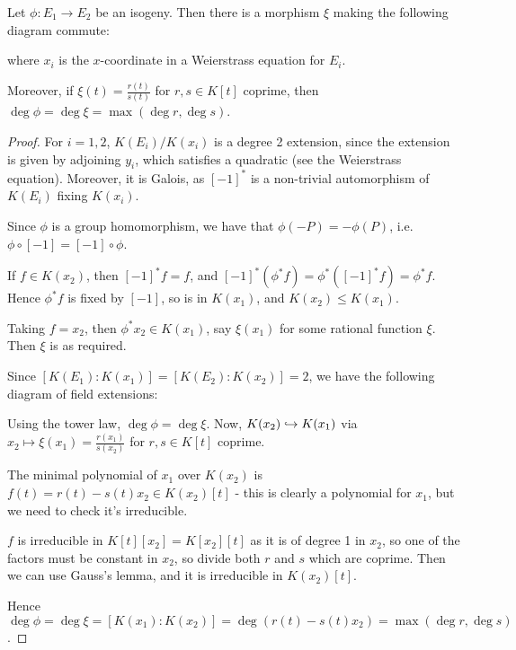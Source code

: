 \documentclass[10pt,a4paper]{article}
\begin{document}
\begin{lemma}
  Let $\phi:E_1\to E_2$ be an isogeny. Then there is a morphism $\xi$ making the following diagram commute:

  \begin{center}
  \end{center}

  where $x_i$ is the $x$-coordinate in a Weierstrass equation for $E_i$.

  Moreover, if $\xi(t) = \frac{r(t)}{s(t)}$ for $r, s \in K[t]$ coprime, then $\deg \phi = \deg \xi = \max(\deg r, \deg s)$.
\end{lemma}
\begin{proof}
  For $i = 1,2$, $K(E_i)/K(x_i)$ is a degree 2 extension, since the extension is given by adjoining $y_i$, which satisfies a quadratic (see the Weierstrass equation). Moreover, it is Galois, as $[-1]^\ast$ is a non-trivial automorphism of $K(E_i)$ fixing $K(x_i)$.

  Since $\phi$ is a group homomorphism, we have that $\phi(-P) = -\phi(P)$, i.e. $\phi \circ [-1] = [-1]\circ \phi$.

  If $f \in K(x_2)$, then $[-1]^\ast f = f$, and $[-1]^\ast (\phi^\ast f) = \phi^\ast ([-1]^\ast f) = \phi^\ast f$. Hence $\phi^\ast f$ is fixed by $[-1]$, so is in $K(x_1)$, and $K(x_2) \leq K(x_1)$.

  Taking $f = x_2$, then $\phi^\ast x_2 \in K(x_1)$, say $\xi(x_1)$ for some rational function $\xi$. Then $\xi$ is as required.

  Since $[K(E_1):K(x_1)] = [K(E_2):K(x_2)] = 2$, we have the following diagram of field extensions:
  \begin{center}
  \end{center}
  Using the tower law, $\deg \phi = \deg \xi$. Now, $K(x_2) \hookrightarrow K(x_1)$ via $x_2 \mapsto \xi(x_1) = \frac{r(x_1)}{s(x_2)}$ for $r, s \in K[t]$ coprime.

  The minimal polynomial of $x_1$ over $K(x_2)$ is $f(t) = r(t)-s(t)x_2 \in K(x_2)[t]$ - this is clearly a polynomial for $x_1$, but we need to check it's irreducible.

  $f$ is irreducible in $K[t][x_2] = K[x_2][t]$ as it is of degree 1 in $x_2$, so one of the factors must be constant in $x_2$, so divide both $r$ and $s$ which are coprime. Then we can use Gauss's lemma, and it is irreducible in $K(x_2)[t]$.

  Hence $\deg \phi = \deg \xi = [K(x_1):K(x_2)] = \deg (r(t)-s(t)x_2) = \max(\deg r, \deg s)$.
\end{proof}
\end{document}
